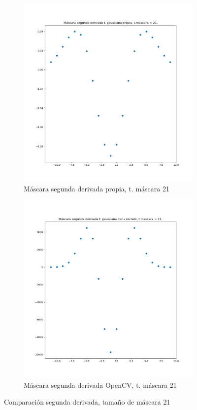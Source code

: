\documentclass[12pt, spanish]{article}
\begin{document}
\begin{figure}[H]
  \centering
	\begin{subfigure}[t]{0.4\textwidth}
		\centering
		\includegraphics[width = \textwidth]{cmp-2p21.png}
 		 \caption{Máscara segunda derivada propia, t. máscara 21}
	\end{subfigure}
	\hspace{1cm}
	\begin{subfigure}[t]{0.4\textwidth}
		\centering
		\includegraphics[width = \textwidth]{cmp-2cv21.png}
 		 \caption{Máscara segunda derivada OpenCV, t. máscara 21}
	\end{subfigure}
	\caption{Comparación segunda derivada, tamaño de máscara 21}


\end{figure}
\end{document}

